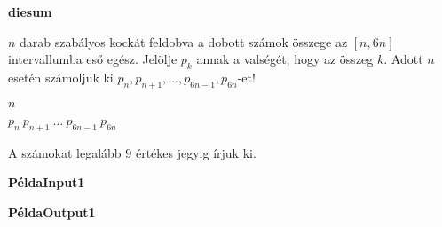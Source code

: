



\centerline {\bf diesum}
\vspace{0.5cm}
\pn
$n$ darab szabályos kockát feldobva a dobott számok összege az $[n,6n]$ intervallumba eső 
egész. Jelölje $p_k$ annak a valségét, hogy az összeg $k$. Adott $n$ esetén számoljuk ki
$p_n,p_{n+1},\ldots,p_{6n-1},p_{6n}$-et!

\vspace{0.5cm}
\pn $n$

\vspace{0.5cm}
\pn $p_n\ p_{n+1}\ \ldots\ p_{6n-1}\ p_{6n}$


\vspace{0.5cm}
\pn A számokat legalább $9$ értékes jegyig írjuk ki. 




\vspace{0.5cm}
\pn
{\bf PéldaInput1}


\pn
{\bf PéldaOutput1}




